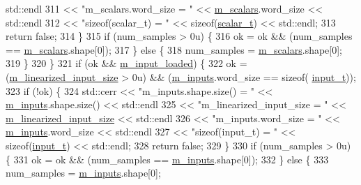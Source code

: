 \begin{DoxyCode}
      std::endl
311                 << \textcolor{stringliteral}{"m\_scalars.word\_size = "} << \hyperlink{classlbann_1_1data__reader__jag_ab0ce0a57903e79f029e91356db8b5441}{m\_scalars}.word\_size << std::endl
312                 << \textcolor{stringliteral}{"sizeof(scalar\_t) = "} << \textcolor{keyword}{sizeof}(\hyperlink{classlbann_1_1data__reader__jag_aa2e01bc071588b9c1a583e5a752abcc6}{scalar\_t}) << std::endl;
313       \textcolor{keywordflow}{return} \textcolor{keyword}{false};
314     \}
315     \textcolor{keywordflow}{if} (num\_samples > 0u) \{
316       ok = ok && (num\_samples == \hyperlink{classlbann_1_1data__reader__jag_ab0ce0a57903e79f029e91356db8b5441}{m\_scalars}.shape[0]);
317     \} \textcolor{keywordflow}{else} \{
318       num\_samples = \hyperlink{classlbann_1_1data__reader__jag_ab0ce0a57903e79f029e91356db8b5441}{m\_scalars}.shape[0];
319     \}
320   \}
321   \textcolor{keywordflow}{if} (ok && \hyperlink{classlbann_1_1data__reader__jag_ae047bbae82c4a8eceedceeea2e1815ad}{m\_input\_loaded}) \{
322     ok = (\hyperlink{classlbann_1_1data__reader__jag_a75e3c8870f9fc8e50fb24e4515ac7d82}{m\_linearized\_input\_size} > 0u) && (\hyperlink{classlbann_1_1data__reader__jag_aa3ae2023ad77d767e717a24b91dbd548}{m\_inputs}.word\_size == \textcolor{keyword}{sizeof}(
      \hyperlink{classlbann_1_1data__reader__jag_ab08c9af4bca496b7889de1473c3d8d4e}{input\_t}));
323     \textcolor{keywordflow}{if} (!ok) \{
324       std::cerr << \textcolor{stringliteral}{"m\_inputs.shape.size() = "} << \hyperlink{classlbann_1_1data__reader__jag_aa3ae2023ad77d767e717a24b91dbd548}{m\_inputs}.shape.size() << std::endl
325                 << \textcolor{stringliteral}{"m\_linearized\_input\_size = "} << \hyperlink{classlbann_1_1data__reader__jag_a75e3c8870f9fc8e50fb24e4515ac7d82}{m\_linearized\_input\_size} << 
      std::endl
326                 << \textcolor{stringliteral}{"m\_inputs.word\_size = "} << \hyperlink{classlbann_1_1data__reader__jag_aa3ae2023ad77d767e717a24b91dbd548}{m\_inputs}.word\_size << std::endl
327                 << \textcolor{stringliteral}{"sizeof(input\_t) = "} << \textcolor{keyword}{sizeof}(\hyperlink{classlbann_1_1data__reader__jag_ab08c9af4bca496b7889de1473c3d8d4e}{input\_t}) << std::endl;
328       \textcolor{keywordflow}{return} \textcolor{keyword}{false};
329     \}
330     \textcolor{keywordflow}{if} (num\_samples > 0u) \{
331       ok = ok && (num\_samples == \hyperlink{classlbann_1_1data__reader__jag_aa3ae2023ad77d767e717a24b91dbd548}{m\_inputs}.shape[0]);
332     \} \textcolor{keywordflow}{else} \{
333       num\_samples = \hyperlink{classlbann_1_1data__reader__jag_aa3ae2023ad77d767e717a24b91dbd548}{m\_inputs}.shape[0];

\end{DoxyCode}
